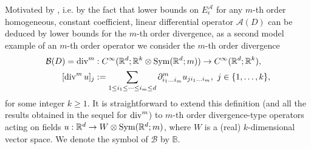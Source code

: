 \documentclass[a4paper, 10pt, twoside, notitlepage]{amsart}
\theoremstyle{plain}
\newcommand{\R}{\mathbb{R}}
\newcommand{\A}{\mathcal{A}}
\renewcommand{\S}[1]{\textup{Sym}(\R^d;#1)}
\begin{document}
            Motivated by \cite[Appendix B]{RRT22}, i.e. by the fact that lower bounds on $E_{\epsilon}^{\A}$ for any $m$-th order homogeneous, constant coefficient, linear differential operator $\A(D)$ can be deduced by lower bounds for the $m$-th order divergence, as a second model example of an $m$-th order operator we consider the $m$-th order divergence
            \begin{gather} \label{eq:DivergenceOp}
              \begin{aligned}
                \mathcal{B}(D) = \di^m &: C^\infty(\R^d;\R^k \otimes \S{m}) \to C^\infty(\R^d;\R^k), \\
                [\di^m u]_j & := \sum_{1\leq i_1 \leq \dots \leq i_m \leq d} \partial_{i_1 \dots i_m}^m u_{j i_1 \dots i_m}, \ j \in \{1,\dots,k\},
              \end{aligned}
            \end{gather}
            for some integer $k\ge1$.
            It is straightforward to extend this definition (and all the results obtained in the sequel for $\operatorname{div}^m$) to $m$-th order divergence-type operators acting on fields $u:\R^d\to W\otimes\S{m}$, where $W$ is a (real) $k$-dimensional vector space. We denote the symbol of $\mathcal{B}$ by $\mathbb{B}$.
            
\end{document}
